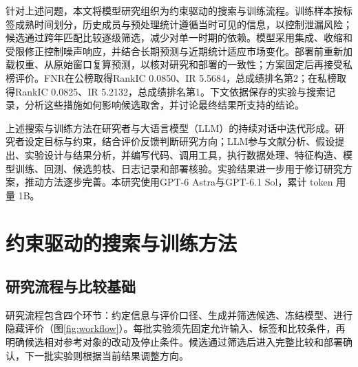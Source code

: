 \documentclass[UTF8,11pt,a4paper,fontset=fandol]{ctexart}
\begin{document}
针对上述问题，本文将模型研究组织为约束驱动的搜索与训练流程。训练样本按标签成熟时间划分，历史成员与预处理统计遵循当时可见的信息，以控制泄漏风险；候选通过跨年匹配比较逐级筛选，减少对单一时期的依赖。模型采用集成、收缩和受限修正控制噪声响应，并结合长期预测与近期统计适应市场变化。部署前重新加载权重、从原始窗口复算预测，以核对研究和部署的一致性；方案固定后再接受私榜评价。FNR在公榜取得RankIC 0.0850、IR 5.5684，总成绩排名第2；在私榜取得RankIC 0.0825、IR 5.2132，总成绩排名第1。下文依据保存的实验与搜索记录，分析这些措施如何影响候选取舍，并讨论最终结果所支持的结论。

上述搜索与训练方法在研究者与大语言模型（LLM）的持续对话中迭代形成。研究者设定目标与约束，结合评价反馈判断研究方向；LLM参与文献分析、假设提出、实验设计与结果分析，并编写代码、调用工具，执行数据处理、特征构造、模型训练、回测、候选剪枝、日志记录和部署核验。实验结果进一步用于修订研究方案，推动方法逐步完善。本研究使用GPT-6 Astra与GPT-6.1 Sol，累计 token 用量 1B。

\section{约束驱动的搜索与训练方法}\label{sec:methods}
\subsection{研究流程与比较基础}\label{sec:protocol}
研究流程包含四个环节：约定信息与评价口径、生成并筛选候选、冻结模型、进行隐藏评价（图\ref{fig:workflow}）。每批实验须先固定允许输入、标签和比较条件，再明确候选相对参考对象的改动及停止条件。候选通过筛选后进入完整比较和部署确认，下一批实验则根据当前结果调整方向。
\end{document}

